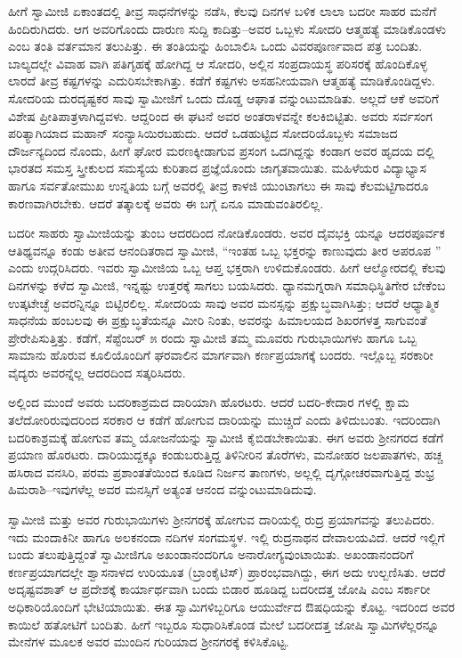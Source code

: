 ಹೀಗೆ ಸ್ವಾಮೀಜಿ ಏಕಾಂತದಲ್ಲಿ ತೀವ್ರ ಸಾಧನೆಗಳನ್ನು ನಡೆಸಿ, ಕೆಲವು ದಿನಗಳ ಬಳಿಕ ಲಾಲಾ ಬದರೀ ಸಾಹರ ಮನೆಗೆ ಹಿಂದಿರುಗಿದರು. ಆಗ ಅವರಿಗೊಂದು ದಾರುಣ ಸುದ್ದಿ ಕಾದಿತ್ತು–ಅವರ ಒಬ್ಬಳು ಸೋದರಿ ಆತ್ಮಹತ್ಯೆ ಮಾಡಿಕೊಂಡಳು ಎಂಬ ತಂತಿ ವರ್ತಮಾನ ತಲುಪಿತ್ತು. ಈ ತಂತಿಯನ್ನು ಹಿಂಬಾಲಿಸಿ ಒಂದು ವಿವರಪೂರ್ಣವಾದ ಪತ್ರ ಬಂದಿತು. ಬಾಲ್ಯದಲ್ಲೇ ವಿವಾಹ ವಾಗಿ ಪತಿಗೃಹಕ್ಕೆ ಹೋಗಿದ್ದ ಆ ಸೋದರಿ, ಅಲ್ಲಿನ ಸಂಪ್ರದಾಯಸ್ಥ ಪರಿಸರಕ್ಕೆ ಹೊಂದಿಕೊಳ್ಳ ಲಾರದೆ ತೀವ್ರ ಕಷ್ಟಗಳನ್ನು ಎದುರಿಸಬೇಕಾಗಿತ್ತು. ಕಡೆಗೆ ಕಷ್ಟಗಳು ಅಸಹನೀಯವಾಗಿ ಆತ್ಮಹತ್ಯೆ ಮಾಡಿಕೊಂಡಿದ್ದಳು. ಸೋದರಿಯ ದುರದೃಷ್ಟಕರ ಸಾವು ಸ್ವಾಮೀಜಿಗೆ ಒಂದು ದೊಡ್ಡ ಆಘಾತ ವನ್ನುಂಟುಮಾಡಿತು. ಅಲ್ಲದೆ ಆಕೆ ಅವರಿಗೆ ವಿಶೇಷ ಪ್ರೀತಿಪಾತ್ರಳಾಗಿದ್ದವಳು. ಆದ್ದರಿಂದ ಈ ಘಟನೆ ಅವರ ಅಂತರಾಳವನ್ನೇ ಕಲಕಿಬಿಟ್ಟಿತು. ಅವರು ಸರ್ವಸಂಗ ಪರಿತ್ಯಾಗಿಯಾದ ಮಹಾನ್ ಸಂನ್ಯಾಸಿಯಿರಬಹುದು. ಆದರೆ ಒಡಹುಟ್ಟಿದ ಸೋದರಿಯೊಬ್ಬಳು ಸಮಾಜದ ದೌರ್ಜನ್ಯದಿಂದ ನೊಂದು, ಹೀಗೆ ಘೋರ ಮರಣಕ್ಕೀಡಾಗುವ ಪ್ರಸಂಗ ಒದಗಿದ್ದನ್ನು ಕಂಡಾಗ ಅವರ ಹೃದಯ ದಲ್ಲಿ ಭಾರತದ ಸಮಸ್ತ ಸ್ತ್ರೀಕುಲದ ಸಮಸ್ಯೆಯ ಕುರಿತಾದ ಪ್ರಜ್ಞೆಯೊಂದು ಜಾಗೃತವಾಯಿತು. ಮಹಿಳೆಯರ ವಿದ್ಯಾಭ್ಯಾಸ ಹಾಗೂ ಸರ್ವತೋಮುಖ ಉನ್ನತಿಯ ಬಗ್ಗೆ ಅವರಲ್ಲಿ ತೀವ್ರ ಕಾಳಜಿ ಯುಂಟಾಗಲು ಈ ಸಾವು ಕೆಲಮಟ್ಟಿಗಾದರೂ ಕಾರಣವಾಗಿರಬೇಕು. ಆದರೆ ತತ್ಕಾಲಕ್ಕೆ ಅವರು ಈ ಬಗ್ಗೆ ಏನೂ ಮಾಡುವಂತಿರಲಿಲ್ಲ.

ಬದರೀ ಸಾಹರು ಸ್ವಾಮೀಜಿಯನ್ನು ತುಂಬ ಆದರದಿಂದ ನೋಡಿಕೊಂಡರು. ಅವರ ದೈವಭಕ್ತಿ ಯನ್ನೂ ಆದರಪೂರ್ವಕ ಆತಿಥ್ಯವನ್ನೂ ಕಂಡು ಅತೀವ ಆನಂದಿತರಾದ ಸ್ವಾಮೀಜಿ, “ಇಂತಹ ಒಬ್ಬ ಭಕ್ತರನ್ನು ಕಾಣುವುದು ತೀರ ಅಪರೂಪ ” ಎಂದು ಉದ್ಗರಿಸಿದರು. ಇವರು ಸ್ವಾಮೀಜಿಯ ಒಬ್ಬ ಆಪ್ತ ಭಕ್ತರಾಗಿ ಉಳಿದುಕೊಂಡರು. ಹೀಗೆ ಆಲ್ಮೋರದಲ್ಲಿ ಕೆಲವು ದಿನಗಳನ್ನು ಕಳೆದ ಸ್ವಾಮೀಜಿ, ಇನ್ನಷ್ಟು ಉತ್ತರಕ್ಕೆ ಸಾಗಲು ಬಯಸಿದರು. ಧ್ಯಾನಮಗ್ನರಾಗಿ ಸಮಾಧಿಸ್ಥಿತಿಗೇರ ಬೇಕೆಂಬ ಉತ್ಕಟೇಚ್ಛೆ ಅವರನ್ನಿನ್ನೂ ಬಿಟ್ಟಿರಲಿಲ್ಲ. ಸೋದರಿಯ ಸಾವು ಅವರ ಮನಸ್ಸನ್ನು ಪ್ರಕ್ಷುಬ್ಧವಾಗಿಸಿತ್ತು; ಆದರೆ ಆಧ್ಯಾತ್ಮಿಕ ಸಾಧನೆಯ ಹಂಬಲವು ಈ ಪ್ರಕ್ಷುಬ್ಧತೆಯನ್ನೂ ಮೀರಿ ನಿಂತು, ಅವರನ್ನು ಹಿಮಾಲಯದ ಶಿಖರಗಳತ್ತ ಸಾಗುವಂತೆ ಪ್ರೇರೇಪಿಸುತ್ತಿತ್ತು. ಕಡೆಗೆ, ಸೆಪ್ಟೆಂಬರ್ ೫ ರಂದು ಸ್ವಾಮೀಜಿ ತಮ್ಮ ಮೂವರು ಗುರುಭಾಯಿಗಳು ಹಾಗೂ ಒಬ್ಬ ಸಾಮಾನು ಹೊರುವ ಕೂಲಿಯೊಂದಿಗೆ ಘರವಾಲಿನ ಮಾರ್ಗವಾಗಿ ಕರ್ಣಪ್ರಯಾಗಕ್ಕೆ ಬಂದರು. ಇಲ್ಲೊಬ್ಬ ಸರಕಾರೀ ವೈದ್ಯರು ಅವರನ್ನೆಲ್ಲ ಆದರದಿಂದ ಸತ್ಕರಿಸಿದರು.

ಅಲ್ಲಿಂದ ಮುಂದೆ ಅವರು ಬದರಿಕಾಶ್ರಮದ ದಾರಿಯಾಗಿ ಹೊರಟರು. ಆದರೆ ಬದರಿ-ಕೇದಾರ ಗಳಲ್ಲಿ ಕ್ಷಾಮ ತಲೆದೋರಿರುವುದರಿಂದ ಸರಕಾರ ಆ ಕಡೆಗೆ ಹೋಗುವ ದಾರಿಯನ್ನು ಮುಚ್ಚಿದೆ ಎಂದು ತಿಳಿದುಬಂತು. ಇದರಿಂದಾಗಿ ಬದರಿಕಾಶ್ರಮಕ್ಕೆ ಹೋಗುವ ತಮ್ಮ ಯೋಜನೆಯನ್ನು ಸ್ವಾಮೀಜಿ ಕೈಬಿಡಬೇಕಾಯಿತು. ಈಗ ಅವರು ಶ್ರೀನಗರದ ಕಡೆಗೆ ಪ್ರಯಾಣ ಹೊರಟರು. ದಾರಿಯುದ್ದಕ್ಕೂ ಕಂಡುಬರುತ್ತಿದ್ದ ತಿಳಿನೀರಿನ ತೊರೆಗಳು, ಮನೋಹರ ಜಲಪಾತಗಳು, ಹಚ್ಚ ಹಸಿರಾದ ವನಸಿರಿ, ಪರಮ ಪ್ರಶಾಂತತೆಯಿಂದ ಕೂಡಿದ ನಿರ್ಜನ ತಾಣಗಳು, ಅಲ್ಲಲ್ಲಿ ದೃಗ್ಗೋಚರವಾಗುತ್ತಿದ್ದ ಶುಭ್ರ ಹಿಮರಾಶಿ–ಇವುಗಳೆಲ್ಲ ಅವರ ಮನಸ್ಸಿಗೆ ಅತ್ಯಂತ ಆನಂದ ವನ್ನುಂಟುಮಾಡಿದುವು.

ಸ್ವಾಮೀಜಿ ಮತ್ತು ಅವರ ಗುರುಭಾಯಿಗಳು ಶ್ರೀನಗರಕ್ಕೆ ಹೋಗುವ ದಾರಿಯಲ್ಲಿ ರುದ್ರ ಪ್ರಯಾಗವನ್ನು ತಲುಪಿದರು. ಇದು ಮಂದಾಕಿನೀ ಹಾಗೂ ಅಲಕನಂದಾ ನದಿಗಳ ಸಂಗಮಸ್ಥಳ. ಇಲ್ಲಿ ರುದ್ರನಾಥನ ದೇವಾಲಯವಿದೆ. ಆದರೆ ಇಲ್ಲಿಗೆ ಬಂದು ತಲುಪುತ್ತಿದ್ದಂತೆ ಸ್ವಾಮೀಜಿಗೂ ಅಖಂಡಾನಂದರಿಗೂ ಅನಾರೋಗ್ಯವುಂಟಾಯಿತು. ಅಖಂಡಾನಂದರಿಗೆ ಕರ್ಣಪ್ರಯಾಗದಲ್ಲೇ ಶ್ವಾಸನಾಳದ ಉರಿಯೂತ (ಬ್ರಾಂಕೈಟಿಸ್) ಪ್ರಾರಂಭವಾಗಿದ್ದು, ಈಗ ಅದು ಉಲ್ಬಣಿಸಿತು. ಆದರೆ ಅದೃಷ್ಟವಶಾತ್ ಆ ಪ್ರದೇಶಕ್ಕೆ ಕಾರ್ಯಾರ್ಥವಾಗಿ ಬಂದು ಬಿಡಾರ ಹೂಡಿದ್ದ ಬದರೀದತ್ತ ಜೋಷಿ ಎಂಬ ಸರ್ಕಾರೀ ಅಧಿಕಾರಿಯೊಂದಿಗೆ ಭೇಟಿಯಾಯಿತು. ಈತ ಸ್ವಾಮಿಗಳಿಬ್ಬರಿಗೂ ಆಯುರ್ವೇದ ಔಷಧಿಯನ್ನು ಕೊಟ್ಟ. ಇದರಿಂದ ಅವರ ಕಾಯಿಲೆ ಹತೋಟಿಗೆ ಬಂದಿತು. ಹೀಗೆ ಇಬ್ಬರೂ ಸುಧಾರಿಸಿಕೊಂಡ ಮೇಲೆ ಬದರೀದತ್ತ ಜೋಷಿ ಸ್ವಾಮಿಗಳೆಲ್ಲರನ್ನೂ ಮೇನೆಗಳ ಮೂಲಕ ಅವರ ಮುಂದಿನ ಗುರಿಯಾದ ಶ್ರೀನಗರಕ್ಕೆ ಕಳಿಸಿಕೊಟ್ಟ.

